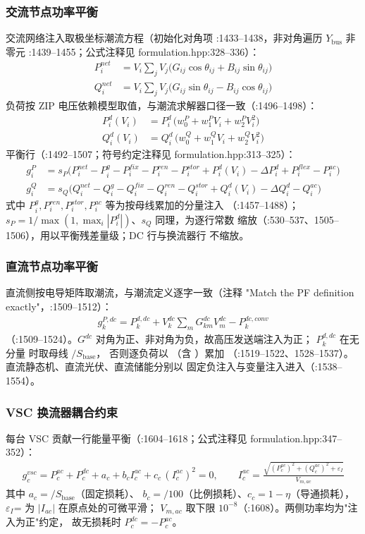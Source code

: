 \subsubsection*{交流节点功率平衡}
交流网络注入取极坐标潮流方程（初始化对角项 :1433--1438，非对角遍历
$Y_{\mathrm{bus}}$ 非零元 :1439--1455；公式注释见
formulation.hpp:328--336）：
\begin{align*}
P^{net}_i&=V_i\sum_{j}V_j\big(G_{ij}\cos\theta_{ij}+B_{ij}\sin\theta_{ij}\big)\\
Q^{net}_i&=V_i\sum_{j}V_j\big(G_{ij}\sin\theta_{ij}-B_{ij}\cos\theta_{ij}\big)
\end{align*}
负荷按 ZIP 电压依赖模型取值，与潮流求解器口径一致（:1496--1498）：
\begin{align*}
P^d_i(V_i)&=P^d_i\,\big(w^{P}_0+w^{P}_1 V_i+w^{P}_2 V_i^2\big)\\
Q^d_i(V_i)&=Q^d_i\,\big(w^{Q}_0+w^{Q}_1 V_i+w^{Q}_2 V_i^2\big)
\end{align*}
平衡行（:1492--1507；符号约定注释见 formulation.hpp:313--325）：
\begin{align*}
g^P_i&=s_P\Big(P^{net}_i-P^g_i-P^{fix}_i-P^{ren}_i-P^{stor}_i
      +P^d_i(V_i)-\Delta P^d_i+P^{flex}_i-P^{ac}_i\Big)\\
g^Q_i&=s_Q\Big(Q^{net}_i-Q^g_i-Q^{fix}_i-Q^{ren}_i-Q^{stor}_i
      +Q^d_i(V_i)-\Delta Q^d_i-Q^{ac}_i\Big)
\end{align*}
式中 $P^g_i,P^{ren}_i,P^{stor}_i,P^{ac}_i$ 等为按母线累加的分量注入
（:1457--1488）；$s_P=1/\max(1,\max_i|P^d_i|)$、$s_Q$ 同理，为逐行常数
缩放（:530--537、1505--1506），用以平衡残差量级；DC 行与换流器行
不缩放。

\subsubsection*{直流节点功率平衡}
直流侧按电导矩阵取潮流，与潮流定义逐字一致（注释
"Match the PF definition exactly"，:1509--1512）：
\begin{align*}
g^{P,dc}_k=P^{d,dc}_k+V^{dc}_k\sum_{m}G^{dc}_{km}V^{dc}_m-P^{dc,conv}_k
\end{align*}
（:1509--1524）。$G^{dc}$ 对角为正、非对角为负，故高压发送端注入为正；
$P^{d,dc}_k$ 在无分量  时取母线 $/S_{\mathrm{base}}$，
否则逐负荷以 （含 ）累加
（:1519--1522、1528--1537）。直流静态机、直流光伏、直流储能分别以
固定负注入与变量注入进入（:1538--1554）。

\subsubsection*{VSC 换流器耦合约束}
每台 VSC 贡献一行能量平衡（:1604--1618；公式注释见
formulation.hpp:347--352）：
\begin{align*}
g^{vsc}_c=P^{ac}_c+P^{dc}_c+a_c+b_c I^{ac}_c+c_c\,(I^{ac}_c)^2=0,\qquad
I^{ac}_c=\frac{\sqrt{(P^{ac}_c)^2+(Q^{ac}_c)^2+\varepsilon_I}}{V_{m,ac}}
\end{align*}
其中 $a_c=$$/S_{\mathrm{base}}$（固定损耗）、
$b_c=$$/100$（比例损耗）、$c_c=1-\eta$（导通损耗），
$\varepsilon_I$= 为 $|I_{ac}|$ 在原点处的可微平滑；
$V_{m,ac}$ 取下限 $10^{-8}$（:1608）。两侧功率均为"注入为正"约定，
故无损耗时 $P^{dc}_c=-P^{ac}_c$。

